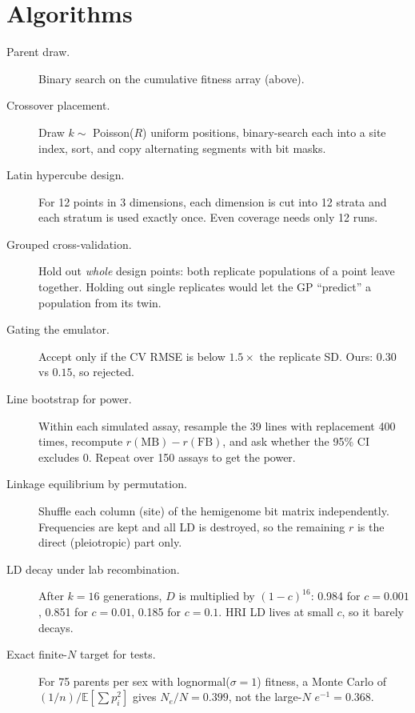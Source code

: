 \section{Algorithms}
\begin{description}
\item[Parent draw.] Binary search on the cumulative fitness array (above).
\item[Crossover placement.] Draw $k\sim$ Poisson($R$) uniform positions, binary-search each into a site index, sort, and copy alternating segments with bit masks.
\item[Latin hypercube design.] For 12 points in 3 dimensions, each dimension is cut into 12 strata and each stratum is used exactly once. Even coverage needs only 12 runs.
\item[Grouped cross-validation.] Hold out \emph{whole} design points: both replicate populations of a point leave together. Holding out single replicates would let the GP ``predict'' a population from its twin.
\item[Gating the emulator.] Accept only if the CV RMSE is below $1.5\times$ the replicate SD. Ours: $0.30$ vs $0.15$, so rejected.
\item[Line bootstrap for power.] Within each simulated assay, resample the 39 lines with replacement 400 times, recompute $r(\mathrm{MB})-r(\mathrm{FB})$, and ask whether the 95\% CI excludes 0. Repeat over 150 assays to get the power.
\item[Linkage equilibrium by permutation.] Shuffle each column (site) of the hemigenome bit matrix independently. Frequencies are kept and all LD is destroyed, so the remaining $r$ is the direct (pleiotropic) part only.
\item[LD decay under lab recombination.] After $k=16$ generations, $D$ is multiplied by $(1-c)^{16}$: 0.984 for $c=0.001$, 0.851 for $c=0.01$, 0.185 for $c=0.1$. HRI LD lives at small $c$, so it barely decays.
\item[Exact finite-$N$ target for tests.] For 75 parents per sex with lognormal($\sigma=1$) fitness, a Monte Carlo of $(1/n)/\mathbb E[\sum p_i^2]$ gives $N_e/N=0.399$, not the large-$N$ $e^{-1}=0.368$.
\end{description}

